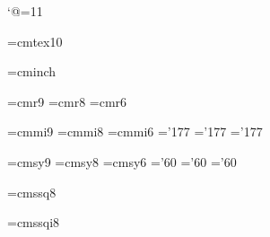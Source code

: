 %
%



\catcode`@=11 %

\font\tentex=cmtex10

\font\inchhigh=cminch
\let\latintitlefont=\titlefont
\def\titlefont{\latintitlefont\hangultitlefont}

\let\lattitlefont=\ttitlefont
\def\ttitlefont{\lattitlefont\hantitlefont}

\font\ninerm=cmr9
\let\mc=\ninerm %
\font\eightrm=cmr8
\font\sixrm=cmr6

\font\ninei=cmmi9
\font\eighti=cmmi8
\font\sixi=cmmi6
\skewchar\ninei='177 \skewchar\eighti='177 \skewchar\sixi='177

\font\ninesy=cmsy9
\font\eightsy=cmsy8
\font\sixsy=cmsy6
\skewchar\ninesy='60 \skewchar\eightsy='60 \skewchar\sixsy='60

\font\eightss=cmssq8

\font\eightssi=cmssqi8

